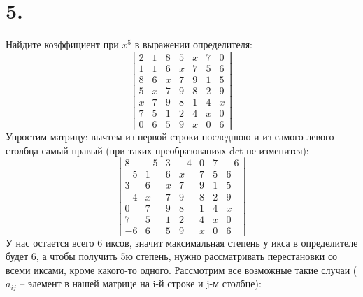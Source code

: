 \documentclass[a4paper,12pt]{article}
\begin{document}
\section*{5.} 
Найдите коэффициент при $x^5$ в выражении определителя:
\[
\left|\begin{matrix}
2 & 1 & 8 & 5 & x & 7 & 0 \\
1 & 1 & 6 & x & 7 & 5 & 6 \\
8 & 6 & x & 7 & 9 & 1 & 5 \\
5 & x & 7 & 9 & 8 & 2 & 9 \\
x & 7 & 9 & 8 & 1 & 4 & x \\
7 & 5 & 1 & 2 & 4 & x & 0 \\
0 & 6 & 5 & 9 & x & 0 & 6
\end{matrix}\right|
\]
Упростим матрицу: вычтем из первой строки последнюю и из самого левого столбца самый правый (при таких преобразованиях det не изменится):
\[
\left|\begin{matrix}
8 & -5 & 3 & -4 & 0 & 7 & -6 \\
-5 & 1 & 6 & x & 7 & 5 & 6 \\
3 & 6 & x & 7 & 9 & 1 & 5 \\
-4 & x & 7 & 9 & 8 & 2 & 9 \\
0 & 7 & 9 & 8 & 1 & 4 & x \\
7 & 5 & 1 & 2 & 4 & x & 0 \\
-6 & 6 & 5 & 9 & x & 0 & 6
\end{matrix}\right|
\]
У нас остается всего 6 иксов, значит максимальная степень у икса в определителе будет 6, а чтобы получить 5ю степень, нужно рассматривать перестановки со всеми иксами, кроме какого-то одного.  Рассмотрим все возможные такие случаи ($a_{ij}$ -- элемент в нашей матрице на i-й строке и j-м столбце):
\end{document}
